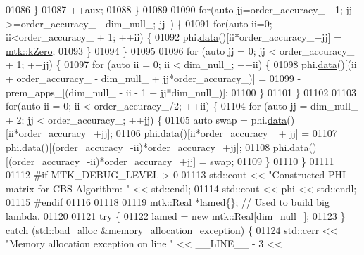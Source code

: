 \begin{DoxyCode}
{{01086       \}
01087       ++aux;
01088     \}
01089 
01090     \textcolor{keywordflow}{for}(\textcolor{keyword}{auto} jj=order\_accuracy\_ - 1; jj >=order\_accuracy\_ - dim\_null\_; jj--) \{
01091       \textcolor{keywordflow}{for}(\textcolor{keyword}{auto} ii=0; ii<order\_accuracy\_ + 1; ++ii) \{
01092         phi.\hyperlink{classmtk_1_1DenseMatrix_a16b3ff56feb2658b9fc7147d1de4d8e7}{data}()[ii*order\_accuracy\_+jj] = \hyperlink{group__c01-roots_ga59a451a5fae30d59649bcda274fea271}{mtk::kZero};
01093       \}
01094     \}
01095 
01096     \textcolor{keywordflow}{for} (\textcolor{keyword}{auto} jj = 0; jj < order\_accuracy\_ + 1; ++jj) \{
01097       \textcolor{keywordflow}{for} (\textcolor{keyword}{auto} ii = 0; ii < dim\_null\_; ++ii) \{
01098         phi.\hyperlink{classmtk_1_1DenseMatrix_a16b3ff56feb2658b9fc7147d1de4d8e7}{data}()[(ii + order\_accuracy\_ - dim\_null\_ + jj*order\_accuracy\_)] =
01099           -prem\_apps\_[(dim\_null\_ - ii - 1 + jj*dim\_null\_)];
01100       \}
01101     \}
01102 
01103     \textcolor{keywordflow}{for}(\textcolor{keyword}{auto} ii = 0; ii < order\_accuracy\_/2; ++ii) \{
01104       \textcolor{keywordflow}{for} (\textcolor{keyword}{auto} jj = dim\_null\_ + 2; jj < order\_accuracy\_; ++jj) \{
01105         \textcolor{keyword}{auto} swap = phi.\hyperlink{classmtk_1_1DenseMatrix_a16b3ff56feb2658b9fc7147d1de4d8e7}{data}()[ii*order\_accuracy\_+jj];
01106         phi.\hyperlink{classmtk_1_1DenseMatrix_a16b3ff56feb2658b9fc7147d1de4d8e7}{data}()[ii*order\_accuracy\_ + jj] =
01107           phi.\hyperlink{classmtk_1_1DenseMatrix_a16b3ff56feb2658b9fc7147d1de4d8e7}{data}()[(order\_accuracy\_-ii)*order\_accuracy\_+jj];
01108         phi.\hyperlink{classmtk_1_1DenseMatrix_a16b3ff56feb2658b9fc7147d1de4d8e7}{data}()[(order\_accuracy\_-ii)*order\_accuracy\_+jj] = swap;
01109       \}
01110     \}
01111 
01112 \textcolor{preprocessor}{    #if MTK\_DEBUG\_LEVEL > 0}
01113     std::cout << \textcolor{stringliteral}{"Constructed PHI matrix for CBS Algorithm: "} << std::endl;
01114     std::cout << phi << std::endl;
01115 \textcolor{preprocessor}{    #endif}
01116 
01118 
01119     \hyperlink{group__c01-roots_gac080bbbf5cbb5502c9f00405f894857d}{mtk::Real} *lamed\{\};  \textcolor{comment}{// Used to build big lambda.}
01120 
01121     \textcolor{keywordflow}{try} \{
01122       lamed = \textcolor{keyword}{new} \hyperlink{group__c01-roots_gac080bbbf5cbb5502c9f00405f894857d}{mtk::Real}[dim\_null\_];
01123     \} \textcolor{keywordflow}{catch} (std::bad\_alloc &memory\_allocation\_exception) \{
01124       std::cerr << \textcolor{stringliteral}{"Memory allocation exception on line "} << \_\_LINE\_\_ - 3 <<
}}
\end{DoxyCode}
